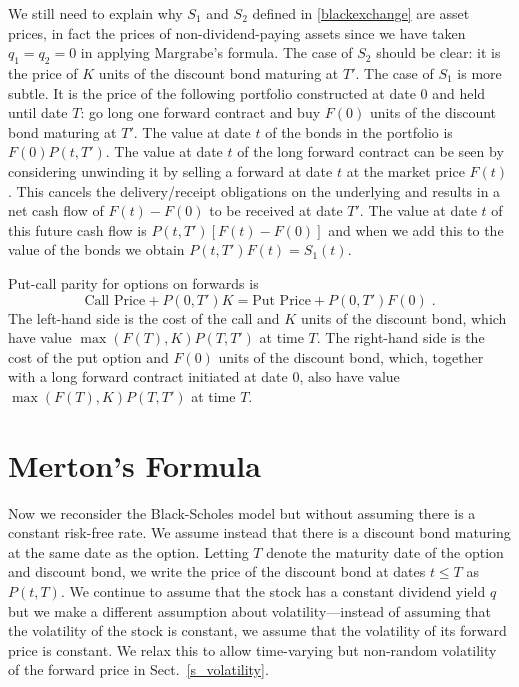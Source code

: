 We still need to explain why $S_1$ and $S_2$ defined in \eqref{blackexchange} are asset prices, in fact the prices of non-dividend-paying assets since we have taken $q_1=q_2=0$ in applying Margrabe's formula.  The case of $S_2$ should be clear: it is the price of $K$ units of the discount bond maturing at $T'$.  The case of $S_1$ is more subtle.  It is the price of the following portfolio constructed at date 0 and held until date $T$: go long one forward contract and buy $F(0)$ units of the discount bond maturing at $T'$.  The value at date $t$ of the bonds in the portfolio is $F(0)P(t,T')$.  The value at date $t$ of the long forward contract can be seen by considering unwinding it by selling a forward at date $t$ at the market price $F(t)$.  This cancels the delivery/receipt obligations on the underlying and results in a net cash flow of $F(t)-F(0)$ to be received at date $T'$.  The value at date $t$ of this future cash flow is $P(t,T')[F(t)-F(0)]$ and when we add this to the value of the bonds we obtain $P(t,T')F(t) = S_1(t)$.

Put-call parity  for options on forwards is
$$\text{Call Price}  + P(0,T')K = \text{Put Price}  + P(0,T')F(0)\; .$$
The left-hand side is the cost of the call and $K$ units of the discount bond, which have value $\max(F(T),K)P(T,T')$ at time $T$.  The right-hand side is the cost of the put option and $F(0)$ units of the discount bond, which, together with a long forward contract initiated at date 0, also have value $\max(F(T),K)P(T,T')$ at time $T$.
  
\section{Merton's Formula}\label{s_merton}
Now we reconsider the Black-Scholes model but without assuming there is a constant risk-free rate.  We assume instead that there is a discount bond maturing at the same date as the option.  Letting $T$ denote the maturity date of the option and discount bond, we write the price of the discount bond at dates $t \leq T$ as $P(t,T)$.  We continue to assume that the stock has a constant dividend yield $q$ but we make a different assumption about volatility---instead of assuming that the volatility of the stock is constant, we assume that the volatility of its forward price is constant.  We relax this to allow time-varying but non-random volatility of the forward price in Sect.~\ref{s_volatility}.

